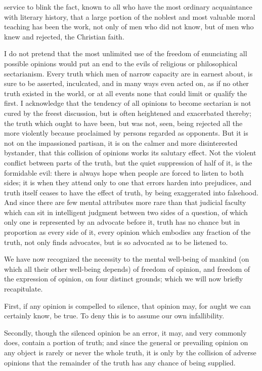 \documentclass[12pt]{report}
\begin{document}
service to blink the fact, known to all who have the most ordinary acquaintance with literary history, that a large portion of the noblest and most valuable moral teaching has been the work, not only of men who did not know, but of men who knew and rejected, the Christian faith.

I do not pretend that the most unlimited use of the freedom of enunciating all possible opinions would put an end to the evils of religious or philosophical sectarianism. Every truth which men of narrow capacity are in earnest about, is sure to be asserted, inculcated, and in many ways even acted on, as if no other truth existed in the world, or at all events none that could limit or qualify the first. I acknowledge that the tendency of all opinions to become sectarian is not cured by the freest discussion, but is often heightened and exacerbated thereby; the truth which ought to have been, but was not, seen, being rejected all the more violently because proclaimed by persons regarded as opponents. But it is not on the impassioned partisan, it is on the calmer and more disinterested bystander, that this collision of opinions works its salutary effect. Not the violent conflict between parts of the truth, but the quiet suppression of half of it, is the formidable evil: there is always hope when people are forced to listen to both sides; it is when they attend only to one that errors harden into prejudices, and truth itself ceases to have the effect of truth, by being exaggerated into falsehood. And since there are few mental attributes more rare than that judicial faculty which can sit in intelligent judgment between two sides of a question, of which only one is represented by an advocate before it, truth has no chance but in proportion as every side of it, every opinion which embodies any fraction of the truth, not only finds advocates, but is so advocated as to be listened to.

We have now recognized the necessity to the mental well-being of mankind (on which all their other well-being depends) of freedom of opinion, and freedom of the expression of opinion, on four distinct grounds; which we will now briefly recapitulate.

First, if any opinion is compelled to silence, that opinion may, for aught we can certainly know, be true. To deny this is to assume our own infallibility.

Secondly, though the silenced opinion be an error, it may, and very commonly does, contain a portion of truth; and since the general or prevailing opinion on any object is rarely or never the whole truth, it is only by the collision of adverse opinions that the remainder of the truth has any chance of being supplied.
\end{document}
